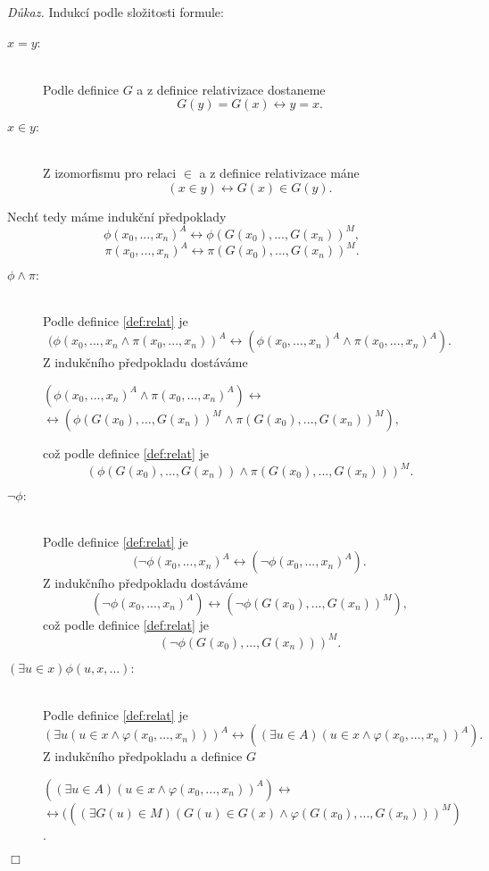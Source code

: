 \documentclass[12pt,a4paper]{article}
\newenvironment{proof}
{\noindent \textit{D\r{u}kaz.}}
{\hspace*{\fill} $\Box$}
\begin{document}
\begin{proof}
Indukc\'{i} podle slo\v{z}itosti formule:
\begin{description}
\item[$x=y$:]
~\\
Podle definice $G$ a z definice relativizace dostaneme \[ G(y)=G(x)\leftrightarrow y=x .\]
\item[$x \in y: $]
~\\
Z izomorfismu pro relaci $ \in $ a z definice relativizace m\'{a}ne \[ (x\in y) \leftrightarrow G(x)\in G(y) .\]
\end{description}
Nech\v{t} tedy m\'{a}me induk\v{c}n\'{i} p\v{r}edpoklady  \[ \phi(x_0,...,x_n)^A \leftrightarrow  \phi(G(x_0),...,G(x_n))^M, \]  \[ \pi(x_0,...,x_n)^A \leftrightarrow  \pi(G(x_0),...,G(x_n))^M . \]
\begin{description}
\item[$\phi \wedge \pi: $] ~\\
Podle definice \ref{def:relat} je 
\[ ( \phi(x_0,...,x_n \wedge  \pi(x_0,...,x_n) )^{A} \leftrightarrow ( \phi(x_0,...,x_n)^{A}\wedge \pi(x_0,...,x_n)^{A})  .\] \newpage
Z induk\v{c}n\'{i}ho p\v{r}edpokladu dost\'{a}v\'{a}me \begin{center}
$ ( \phi(x_0,...,x_n)^{A}\wedge \pi(x_0,...,x_n)^{A}) \leftrightarrow  $ $ \leftrightarrow( \phi(G(x_0),...,G(x_n))^{M}\wedge \pi(G(x_0),...,G(x_n))^{M}),  $
\end{center}
co\v{z} podle definice \ref{def:relat} je \[ ( \phi(G(x_0),...,G(x_n)) \wedge  \pi(G(x_0),...,G(x_n)) )^{M} .\]
\item[$\neg \phi: $]~\\
Podle definice \ref{def:relat} je 
\[ ( \neg \phi(x_0,...,x_n)^{A} \leftrightarrow ( \neg \phi(x_0,...,x_n)^{A} ).\] 
Z induk\v{c}n\'{i}ho p\v{r}edpokladu dost\'{a}v\'{a}me 
 \[ ( \neg \phi(x_0,...,x_n)^{A}) \leftrightarrow ( \neg \phi(G(x_0),...,G(x_n))^{M}), \]
co\v{z} podle definice \ref{def:relat} je \[  (\neg \phi(G(x_0),...,G(x_n)))^{M}.\]
\item[$(\exists u\in x)\phi(u,x,...): $]~ \\
Podle definice \ref{def:relat} je 
\[  (\exists u(u\in x \wedge \varphi(x_0,...,x_n)))^{A} \leftrightarrow ((\exists u \in A)(u\in x \wedge \varphi(x_0,...,x_n))^{A}) .\]
Z induk\v{c}n\'{i}ho p\v{r}edpokladu a definice $ G $
\begin{center}
$  ((\exists u \in A)(u\in x \wedge \varphi(x_0,...,x_n))^{A}) \leftrightarrow $ \\$ \leftrightarrow (((\exists G(u) \in M)(G(u)\in G(x) \wedge \varphi(G(x_0),...,G(x_n)))^{M})  $.
\end{center}
\end{description}
\end{proof}
\end{document}
